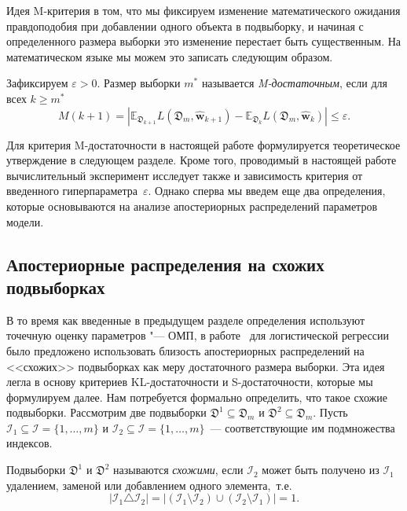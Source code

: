 Идея M-критерия в том, что мы фиксируем изменение математического ожидания правдоподобия при добавлении одного объекта в подвыборку, и начиная с определенного размера выборки это изменение перестает быть существенным. На математическом языке мы можем это записать следующим образом.

\begin{definition}
    Зафиксируем $\varepsilon > 0$. Размер выборки $m^*$ называется \emph{M-достаточным}, если для всех $k \geqslant m^*$
    \begin{equation}
    \label{eq:M-sufficient}
    M(k+1) = \left| \mathbb{E}_{\mathfrak{D}_{k+1}} L(\mathfrak{D}_m, \hat{\mathbf{w}}_{k+1}) - \mathbb{E}_{\mathfrak{D}_k} L(\mathfrak{D}_m, \hat{\mathbf{w}}_k) \right| \leqslant \varepsilon.
    \end{equation}
\end{definition}

Для критерия M-достаточности в настоящей работе формулируется теоретическое утверждение в следующем разделе. Кроме того, проводимый в настоящей работе вычислительный эксперимент исследует также и зависимость критерия от введенного гиперпараметра~$\varepsilon$. Однако сперва мы введем еще два определения, которые основываются на анализе апостериорных распределений параметров модели.

\subsection{Апостериорные распределения на схожих подвыборках}

В то время как введенные в предыдущем разделе определения используют точечную оценку параметров "--- ОМП, в работе~\cite{MOTRENKO2014743} для логистической регрессии было предложено использовать близость апостериорных распределений на <<схожих>> подвыборках как меру достаточного размера выборки. Эта идея легла в основу критериев KL-достаточности и S-достаточности, которые мы формулируем далее. Нам потребуется формально определить, что такое схожие подвыборки. Рассмотрим две подвыборки $\mathfrak{D}^1 \subseteq \mathfrak{D}_m$ и $\mathfrak{D}^2 \subseteq \mathfrak{D}_m$. Пусть $\mathcal{I}_1 \subseteq \mathcal{I} = \{ 1, \ldots, m \}$ и $\mathcal{I}_2 \subseteq \mathcal{I} = \{ 1, \ldots, m \}$~--- соответствующие им подмножества индексов.

\begin{definition}
    Подвыборки $\mathfrak{D}^1$ и $\mathfrak{D}^2$ называются \emph{схожими}, если $\mathcal{I}_2$ может быть получено из $\mathcal{I}_1$ удалением, заменой или добавлением одного элемента,~т.\:е.
    \begin{equation}
        \left| \mathcal{I}_1 \triangle \mathcal{I}_2 \right| = \left| \left( \mathcal{I}_1 \setminus \mathcal{I}_2 \right) \cup \left( \mathcal{I}_2 \setminus \mathcal{I}_1 \right) \right| = 1.
    \end{equation}
\end{definition}

